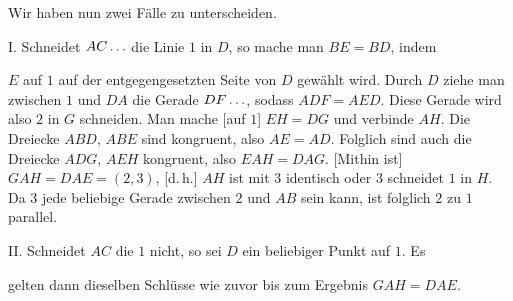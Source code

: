 Wir haben nun zwei Fälle zu unterscheiden.

I. Schneidet $AC\mathinner{.\,.\,.}$ die Linie $1$ in $D$, so mache man $BE = BD$, indem

\begin{center}

\end{center}
\noindent $E$ auf $1$ auf der entgegengesetzten Seite von $D$ gewählt wird. Durch $D$ ziehe man zwischen $1$ und $DA$ die Gerade $DF\mathinner{.\,.\,.}$, sodass $ADF = AED$. Diese Gerade wird also $2$ in $G$ schneiden. Man mache [auf $1$] $EH = DG$ und verbinde $AH$. Die Dreiecke $ABD$, $ABE$ sind kongruent, also $AE = AD$. Folglich sind auch die Dreiecke $ADG$, $AEH$ kongruent, also $EAH = DAG$. [Mithin ist] $GAH = DAE = (2,3)$, [d.\,h.] $AH$ ist mit $3$ identisch oder $3$ schneidet $1$ in $H$. Da $3$ jede beliebige Gerade zwischen $2$ und $AB$ sein kann, ist folglich $2$ zu $1$ parallel.

II. Schneidet $AC$ die $1$ nicht, so sei $D$ ein beliebiger Punkt auf $1$. Es

\begin{center}

\end{center}
\noindent gelten dann dieselben Schlüsse wie zuvor bis zum Ergebnis $GAH = DAE$.
